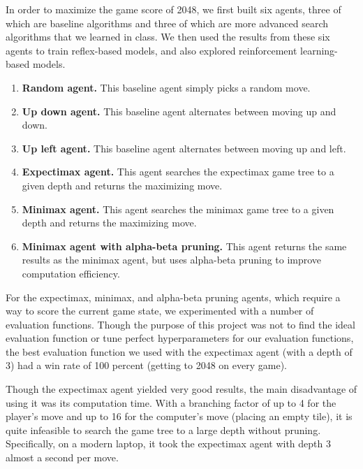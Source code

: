 \documentclass[9pt,twocolumn]{article}
\begin{document}
In order to maximize the game score of 2048, we first built six agents, three of which are baseline algorithms and three of which are more advanced search algorithms that we learned in class. We then used the results from these six agents to train reflex-based models, and also explored reinforcement learning-based models.

\begin{enumerate}[1)]

\item \textbf{Random agent.} This baseline agent simply picks a random move.

\item \textbf{Up down agent.} This baseline agent alternates between moving up and down.

\item \textbf{Up left agent.} This baseline agent alternates between moving up and left.

\item \textbf{Expectimax agent.} This agent searches the expectimax game tree to a given depth and returns the maximizing move.

\item \textbf{Minimax agent.} This agent searches the minimax game tree to a given depth and returns the maximizing move.

\item \textbf{Minimax agent with alpha-beta pruning.} This agent returns the same results as the minimax agent, but uses alpha-beta pruning to improve computation efficiency.

\end{enumerate}

For the expectimax, minimax, and alpha-beta pruning agents, which require a way to score the current game state, we experimented with a number of evaluation functions. Though the purpose of this project was not to find the ideal evaluation function or tune perfect hyperparameters for our evaluation functions, the best evaluation function we used with the expectimax agent (with a depth of 3) had a win rate of 100 percent (getting to 2048 on every game).

Though the expectimax agent yielded very good results, the main disadvantage of using it was its computation time. With a branching factor of up to 4 for the player’s move and up to 16 for the computer’s move (placing an empty tile), it is quite infeasible to search the game tree to a large depth without pruning. Specifically, on a modern laptop, it took the expectimax agent with depth 3 almost a second per move.
\end{document}
